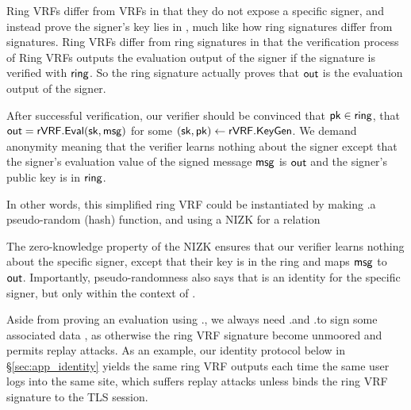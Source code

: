 Ring VRFs differ from VRFs in that they do not expose a specific signer,
and instead prove the signer's key lies in  \ring,
much like how ring signatures differ from signatures.
Ring VRFs differ from ring signatures in that the verification process of Ring VRFs outputs the evaluation output \Out of the signer if the signature is verified with $ \mathsf{ring} $. So  the ring signature  actually proves that $ {\mathsf{out}} $ is the evaluation output of the signer. 

After successful verification, our verifier should be convinced that $\mathsf{pk} \in \mathsf{ring}$, that
${\mathsf{out}} = {\mathsf{rVRF}}.{\mathsf{Eval}}(\mathsf{sk},\mathsf{msg})$ for some $(\mathsf{sk},\mathsf{pk}) \leftarrow {\ensuremath{\mathsf{rVRF}}}.{\mathsf{KeyGen}}$. We demand anonymity meaning that the verifier learns nothing about the signer except that the signer's evaluation value of the signed message $ \mathsf{msg} $ is $ {\mathsf{out}} $ and the signer's public key is in $ \mathsf{ring} $.

In other words, this simplified ring VRF could be instantiated by making
\rVRF.\Eval a pseudo-random (hash) function, and using a NIZK for a relation
\vspace{-3mm}



The zero-knowledge property of the NIZK ensures that our verifier learns nothing about the specific
signer, except that their key is in the ring and maps $\mathsf{msg}$ to ${\mathsf{out}}$.
Importantly, pseudo-randomness also says that \Out is an identity
for the specific signer, but only within the context of \msg.


Aside from proving an evaluation using \rVRF.\Eval, 
we always need \rVRF.\Sign and \rVRF.\Verify to sign some associated data \aux,
as otherwise the ring VRF signature become unmoored and permits replay attacks.
%
As an example, our identity protocol below in \S\ref{sec:app_identity}
yields the same ring VRF outputs each time the same user logs into the
same site, which suffers replay attacks unless \aux binds the
ring VRF signature to the TLS session.

